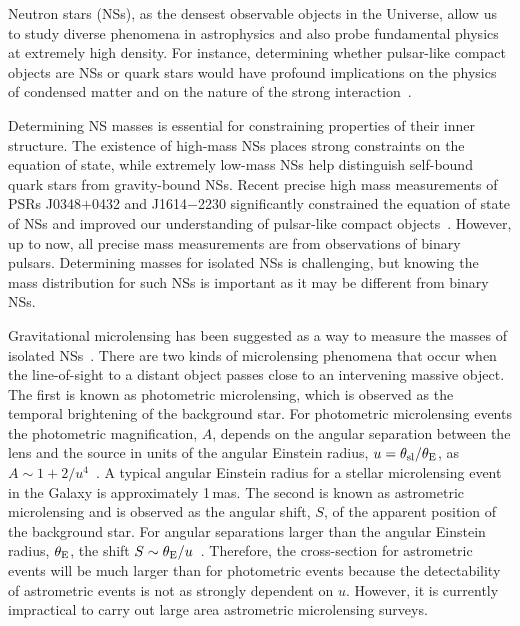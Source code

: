 \documentclass[iop,apj]{emulateapj}
\begin{document}
Neutron stars (NSs), as the densest observable objects in the Universe,
allow us to study diverse phenomena in
astrophysics and also probe fundamental physics at extremely high 
density. For instance, determining whether pulsar-like compact objects
are NSs or quark stars would have profound implications on the physics of
condensed matter and on the nature of the strong interaction~\citep[e.g.,][for a review]{Weber,Xu10}.

Determining NS masses is essential for constraining properties 
of their inner structure.
%
The existence of high-mass NSs places strong constraints on the 
equation of state, while extremely low-mass NSs help distinguish 
self-bound quark stars from gravity-bound NSs.
%
Recent precise high mass measurements of PSRs J0348$+$0432 and J1614$-$2230
significantly constrained the equation of state of NSs and improved our 
understanding of pulsar-like compact objects~\citep{Anton,Demorest,Ozel2010,Lai2011}.
%
However, up to now, all precise mass measurements are from observations
of binary pulsars. Determining masses for isolated NSs is challenging, 
but knowing the mass distribution for such NSs is important as it may be 
different from binary NSs.
%

Gravitational microlensing has been suggested as a 
way to measure the masses of isolated NSs~\citep[e.g.,][]{Dai,Schwarz02,Horvath96}.
%
There are two kinds of microlensing phenomena that occur when the 
line-of-sight to a distant object passes close to an intervening massive object.
The first is known as photometric microlensing, which is observed as the temporal 
brightening of the background star. For photometric microlensing events the photometric 
magnification, $A$, depends on the angular separation between the lens and the 
source in units of the angular Einstein radius, $u=\theta_{\rm{sl}}/\theta_{\rm{E}}$, 
as $A\sim 1+2/u^{4}$~\citep{mao}. A typical angular Einstein radius
for a stellar microlensing event in the Galaxy is approximately 1\,mas. 
The second is known as astrometric microlensing and is observed as the angular shift, 
$S$, of the apparent position of the background star. For angular separations larger 
than the angular Einstein radius, $\theta_{\rm{E}}$, the shift $S \sim \theta_{\rm{E}}/u$~\citep[e.g.,][hereafter BE02]{Bel}.  
Therefore, the cross-section for astrometric events will be much larger than for 
photometric events because the detectability of astrometric events is not as 
strongly dependent on $u$. However, it is currently impractical to carry out 
large area astrometric microlensing surveys.
\end{document}
